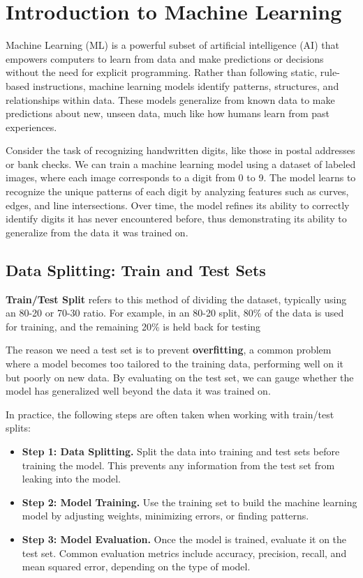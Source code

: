 \section{Introduction to Machine Learning}
    \large Machine Learning (ML) is a powerful subset of artificial intelligence (AI) that empowers computers to learn from data and make predictions or decisions without the need for explicit programming. Rather than following static, rule-based instructions, machine learning models identify patterns, structures, and relationships within data. These models generalize from known data to make predictions about new, unseen data, much like how humans learn from past experiences.
    
    Consider the task of recognizing handwritten digits, like those in postal addresses or bank checks. We can train a machine learning model using a dataset of labeled images, where each image corresponds to a digit from 0 to 9. The model learns to recognize the unique patterns of each digit by analyzing features such as curves, edges, and line intersections. Over time, the model refines its ability to correctly identify digits it has never encountered before, thus demonstrating its ability to generalize from the data it was trained on.
\subsection{Data Splitting: Train and Test Sets}
\large \textbf{Train/Test Split} refers to this method of dividing the dataset, typically using an 80-20 or 70-30 ratio. For example, in an 80-20 split, 80\% of the data is used for training, and the remaining 20\% is held back for testing


The reason we need a test set is to prevent \textbf{overfitting}, a common problem where a model becomes too tailored to the training data, performing well on it but poorly on new data. By evaluating on the test set, we can gauge whether the model has generalized well beyond the data it was trained on.

In practice, the following steps are often taken when working with train/test splits:
\begin{itemize}
    \item \textbf{Step 1: Data Splitting.} Split the data into training and test sets before training the model. This prevents any information from the test set from leaking into the model.
    \item \textbf{Step 2: Model Training.} Use the training set to build the machine learning model by adjusting weights, minimizing errors, or finding patterns.
    \item \textbf{Step 3: Model Evaluation.} Once the model is trained, evaluate it on the test set. Common evaluation metrics include accuracy, precision, recall, and mean squared error, depending on the type of model.
\end{itemize}

